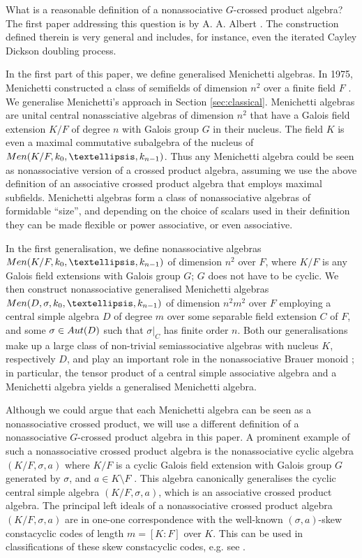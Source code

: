 \documentclass[11pt]{amsart}
\theoremstyle{plain}
\theoremstyle{definition}
\begin{document}
What is a reasonable definition of a nonassociative  $G$-crossed product algebra? The first paper addressing this question is by A. A. Albert \cite{A1}. The construction defined therein is very general and includes, for instance, even the iterated Cayley Dickson doubling process.


 In the first part of this paper, we define generalised Menichetti algebras. In 1975, Menichetti constructed a class of semifields of dimension $n^2$ over a finite field $F$ \cite{M}.
 We generalise Menichetti's approach  in Section \ref{sec:classical}.
Menichetti algebras are unital central nonassciative algebras of dimension $n^2$ that have a  Galois field extension $K/F$ of degree $n$ with Galois group $G$ in their nucleus.  The field $K$ is even  a maximal commutative subalgebra of the  nucleus of ${\rm Men}(K/F,k_0,\dots, k_{n-1})$. Thus any Menichetti algebra could be seen as nonassociative version of a crossed product algebra, assuming we use the above definition of an associative crossed product algebra that employs maximal subfields. Menichetti algebras form a class of nonassociative algebras of formidable ``size'', and depending on the choice of scalars used in their definition they can be made flexible or power associative, or even associative.



In the first generalisation, we define  nonassociative algebras ${\rm Men}(K/F,k_0,\dots, k_{n-1})$ of dimension $n^2$ over $F$, where
 $K/F$ is any Galois field extensions  with Galois group $G$; $G$ does not have to be cyclic.  We then construct nonassociative generalised Menichetti algebras ${\rm Men}(D,\sigma,k_0,\dots, k_{n-1})$ of dimension $n^2m^2$ over $F$ employing a central simple algebra $D$ of degree $m$ over some separable field extension $C$ of $F$, and some $\sigma\in {\rm Aut}(D)$ such that
$\sigma|_{C}$ has finite order $n$. Both our generalisations  make up a large class of non-trivial  semiassociative algebras with nucleus $K$, respectively $D$, and play an important role in the nonassociative Brauer monoid \cite{BHMRV}; in particular, the tensor product of a central simple associative algebra and a Menichetti algebra yields a generalised Menichetti algebra.



 Although we could argue that each Menichetti algebra can be seen as a nonassociative crossed product, we will use a different definition of a nonassociative $G$-crossed product algebra in this paper. 
 A prominent example of such a nonassociative crossed product algebra is the nonassociative cyclic algebra $(K/F,\sigma,a)$ where $K/F$ is a cyclic Galois field extension with Galois group $G$ generated by $\sigma$, and $a\in K\setminus F$ \cite{St, W}. This algebra canonically generalises the  cyclic central simple algebra $(K/F,\sigma,a)$, which is an associative crossed product algebra.  The principal left ideals of a nonassociative crossed product algebra $(K/F,\sigma,a)$ are in one-one correspondence with the well-known $(\sigma,a)$-skew
constacyclic codes of length $m=[K:F]$ over $K$. This can be used in classifications of these skew constacyclic codes, e.g. see \cite{NevPum2025, Pum2025}.
\end{document}
